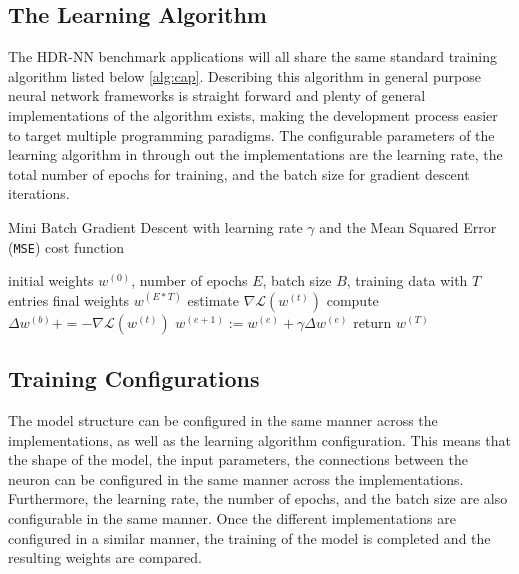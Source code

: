 \subsection[HDR-NN Training]{The Learning Algorithm}

The HDR-NN benchmark applications will all share the same standard training algorithm listed below \ref{alg:cap}. Describing this algorithm in general purpose neural network frameworks is straight forward and plenty of general implementations of the algorithm exists, making the development process easier to target multiple programming paradigms. The configurable parameters of the learning algorithm in through out the implementations are the learning rate, the total number of epochs for training, and the batch size for gradient descent iterations.

\begin{algorithm}
	\caption{Mini Batch Gradient Descent with learning rate $\gamma$ and the Mean Squared Error (\texttt{MSE}) cost function}\label{alg:cap}
	\begin{algorithmic}
	\Require initial weights $w^{(0)}$, number of epochs $E$, batch size $B$, training data with $T$ entries
	\Ensure final weights $w^{(E*T)}$
			\State estimate $\nabla \mathcal{L}(w^{(t)})$ 
			\State compute $\Delta w^{(b)} += - \nabla \mathcal{L}(w^{(t)})$\label{lin:deep-learning-delta-w}
			\EndFor
			\State $w^{(e + 1)} := w^{(e)} + \gamma \Delta w^{(e)}$
		\EndFor
	\EndFor
	\State return $w^{(T)}$
	\end{algorithmic}
\end{algorithm}

\subsection{Training Configurations}

The model structure can be configured in the same manner across the implementations, as well as the learning algorithm configuration. This means that the shape of the model, the input parameters, the connections between the neuron can be configured in the same manner across the implementations. Furthermore, the learning rate, the number of epochs, and the batch size are also configurable in the same manner. Once the different implementations are configured in a similar manner, the training of the model is completed and the resulting weights are compared.

